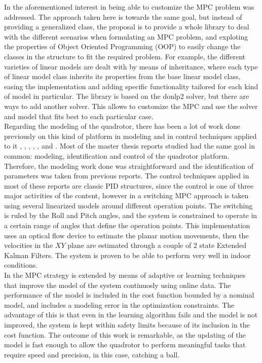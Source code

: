 In \cite{Rosendo2009} the aforementioned interest in being able to customize the MPC problem was addressed. The approach taken here is towards the same goal, but instead of providing a generalized class, the proposal is to provide a whole library to deal with the different scenarios when formulating an MPC problem, and exploting the properties of Object Oriented Programming (OOP) to easily change the classes in the structure to fit the required problem. For example, the different varieties of linear models are dealt with by means of inheritance, where each type of linear model class inherits its properties from the base linear model class, easing the implementation and adding specific functionality tailored for each kind of model in particular. The library is based on the donlp2 solver, but there are ways to add another solver. This allows to customize the MPC and use the solver and model that fits best to each particular case. \\

Regarding the modeling of the quadrotor, there has been a lot of work done previously on this kind of platform in modeling and in control techniques applied to it \cite{Bouabdallah2004},  \cite{Bresciani2008}, \cite{Lellis}, \cite{Raffo2007}, \cite{Salih2010}, \cite{YueSun2012} and \cite{MahoneyKumarCorke2012}. Most of the master thesis reports studied had the same goal in common: modeling, identification and control of the quadrotor platform. Therefore, the modeling work done was straightforward and the identification of parameters was taken from previous reports. The control techniques applied in most of these reports are classic PID structures, since the control is one of three major activities of the content, however in \cite{Alexis2011} a switching MPC approach is taken using several linearized models around different operation points. The switching is ruled by the Roll and Pitch angles, and the system is constrained to operate in a certain range of angles that define the operation points. This implementation uses an optical flow device to estimate the planar motion movements, then the velocities in the $XY$ plane are estimated through a couple of 2 state Extended Kalman Filters. The system is proven to be able to perform very well in indoor conditions.\\

In \cite{Bouffard2012} the MPC strategy is extended by means of adaptive or learning techniques that improve the model of the system continuosly using online data. The performance of the model is included in the cost function bounded by a nominal model, and includes a modeling error in the optimization constraints. The advantage of this is that even in the learning algorithm fails and the model is not improved, the system is kept within safety limits because of its inclusion in the cost function. The outcome of this work is remarkable, as the updating of the model is fast enough to allow the quadrotor to perform meaningful tasks that require speed and precision, in this case, catching a ball.

